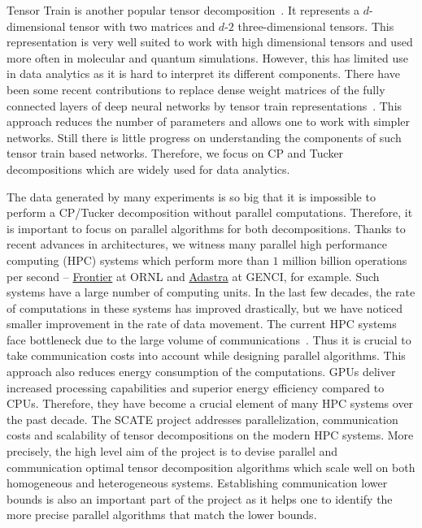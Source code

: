 \documentclass[a4paper,11pt]{article}
\begin{document}
	 
	Tensor Train is another popular tensor decomposition~\cite{O-SIAM-2011}. It represents a $d$-dimensional tensor with two matrices and $d$-$2$ three-dimensional tensors. This representation is very well suited to work with high dimensional tensors and used more often in molecular and quantum simulations. However, this has limited use in data analytics as it is hard to interpret its different components. There have been some recent contributions to replace dense weight matrices of the fully connected layers of deep neural networks by tensor train representations~\cite{NPOV-NIPS-2015}. This approach reduces the number of parameters and allows one to work with simpler networks. Still there is little progress on understanding the components of such tensor train based networks. Therefore, we focus on CP and Tucker decompositions which are widely used for data analytics. 
	
	
	The data generated by many experiments is so big that it is impossible to perform a CP/Tucker decomposition without parallel computations. Therefore, it is important to focus on parallel algorithms for both decompositions. Thanks to recent advances in architectures, we witness many parallel high performance computing (HPC) systems which perform more than $1$ million billion operations per second -- \href{https://www.olcf.ornl.gov/frontier}{Frontier} at ORNL and \href{https://www.genci.fr/en/our-computers}{Adastra} at GENCI, for example. Such systems have a large number of computing units. In the last few decades, the rate of computations in these systems has improved drastically, but we have noticed smaller improvement in the rate of data movement. The current HPC systems face bottleneck due to the large volume of communications~\cite{DOE-Report-2014}. Thus it is crucial to take communication costs into account while designing parallel algorithms. This approach also reduces energy consumption of the computations. GPUs deliver increased processing capabilities and superior energy efficiency compared to CPUs. Therefore, they have become a crucial element of many HPC systems over the past decade. The SCATE project addresses parallelization, communication costs and scalability of tensor decompositions on the modern HPC systems. More precisely, the high level aim of the project is to devise parallel and communication optimal tensor decomposition algorithms which scale well on both homogeneous and heterogeneous systems. Establishing communication lower bounds is also an important part of the project as it helps one to identify the more precise parallel algorithms that match the lower bounds.
	
\end{document}
